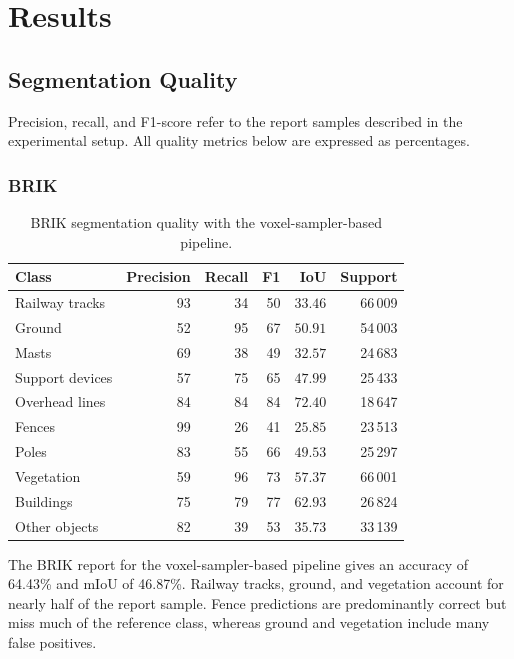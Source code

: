 \section{Results}

\subsection{Segmentation Quality}

Precision, recall, and F1-score refer to the report samples described in the experimental setup. All quality metrics below are expressed as percentages.

\subsubsection{BRIK}

\begin{table}[H]
  \centering
  \caption{BRIK segmentation quality with the voxel-sampler-based pipeline.}
  \label{tab:brik_voxel}
  \small
  \begin{tabular}{lrrrrr}
    \toprule
    Class & Precision & Recall & F1 & IoU & Support \\
    \midrule
    Railway tracks & 93 & 34 & 50 & $33.46$ & 66\,009 \\
    Ground & 52 & 95 & 67 & $50.91$ & 54\,003 \\
    Masts & 69 & 38 & 49 & $32.57$ & 24\,683 \\
    Support devices & 57 & 75 & 65 & $47.99$ & 25\,433 \\
    Overhead lines & 84 & 84 & 84 & $72.40$ & 18\,647 \\
    Fences & 99 & 26 & 41 & $25.85$ & 23\,513 \\
    Poles & 83 & 55 & 66 & $49.53$ & 25\,297 \\
    Vegetation & 59 & 96 & 73 & $57.37$ & 66\,001 \\
    Buildings & 75 & 79 & 77 & $62.93$ & 26\,824 \\
    Other objects & 82 & 39 & 53 & $35.73$ & 33\,139 \\
    \bottomrule
  \end{tabular}
\end{table}

The BRIK report for the voxel-sampler-based pipeline gives an accuracy of 64.43\% and mIoU of 46.87\%. Railway tracks, ground, and vegetation account for nearly half of the report sample. Fence predictions are predominantly correct but miss much of the reference class, whereas ground and vegetation include many false positives.


